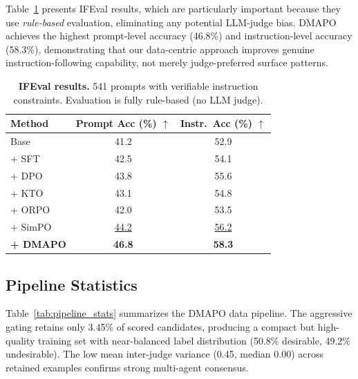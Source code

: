 \documentclass[10pt,twocolumn]{article}
\newcommand{\ours}{\textsc{DMAPO}}
\newcommand{\best}[1]{\textbf{#1}}
\newcommand{\second}[1]{\underline{#1}}
\newcommand{\up}{$\uparrow$}
\begin{document}
Table~\ref{tab:ifeval} presents IFEval results, which are particularly important because they use \emph{rule-based} evaluation, eliminating any potential LLM-judge bias.
\ours{} achieves the highest prompt-level accuracy (46.8\%) and instruction-level accuracy (58.3\%), demonstrating that our data-centric approach improves genuine instruction-following capability, not merely judge-preferred surface patterns.

\begin{table}[t]
\centering
\caption{\textbf{IFEval results.}
541 prompts with verifiable instruction constraints.
Evaluation is fully rule-based (no LLM judge).}
\label{tab:ifeval}
\vspace{0.5em}
\begin{tabular}{l cc}
\toprule
\textbf{Method} & \textbf{Prompt Acc (\%)} \up{} & \textbf{Instr.\ Acc (\%)} \up{} \\
\midrule
Base       & 41.2 & 52.9 \\
+ SFT      & 42.5 & 54.1 \\
+ DPO      & 43.8 & 55.6 \\
+ KTO      & 43.1 & 54.8 \\
+ ORPO     & 42.0 & 53.5 \\
+ SimPO    & \second{44.2} & \second{56.2} \\
\midrule
\textbf{+ \ours{}} & \best{46.8} & \best{58.3} \\
\bottomrule
\end{tabular}
\end{table}



\subsection{Pipeline Statistics}
\label{sec:pipeline_stats}

Table~\ref{tab:pipeline_stats} summarizes the \ours{} data pipeline.
The aggressive gating retains only 3.45\% of scored candidates, producing a compact but high-quality training set with near-balanced label distribution (50.8\% desirable, 49.2\% undesirable).
The low mean inter-judge variance (0.45, median 0.00) across retained examples confirms strong multi-agent consensus.
\end{document}
